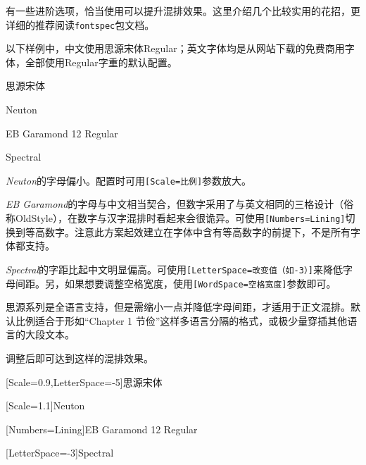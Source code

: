 \documentclass[10pt,openany]{book}
\begin{document}
\begin{sloppypar}
    有一些进阶选项，恰当使用可以提升混排效果。这里介绍几个比较实用的花招，更详细的推荐阅读\texttt{fontspec}包文档。

    以下样例中，中文使用思源宋体Regular；英文字体均是从网站下载的免费商用字体，全部使用Regular字重的默认配置。

    \begin{adjustwidth}{2em}{2em}
        \large\blankpar

        思源宋体\testtext

        Neuton\testtext

        EB Garamond 12 Regular\testtext

        Spectral\testtext

        \blankpar
    \end{adjustwidth}

    \textit{Neuton}的字母偏小。配置时可用\texttt{{[}Scale=比例{]}}参数放大。

    \textit{EB Garamond}的字母与中文相当契合，但数字采用了与英文相同的三格设计（俗称OldStyle），在数字与汉字混排时看起来会很诡异。可使用\texttt{{[}Numbers=Lining{]}}切换到等高数字。注意此方案起效建立在字体中含有等高数字的前提下，不是所有字体都支持。

    \textit{Spectral}的字距比起中文明显偏高。可使用\texttt{{[}LetterSpace=改变值（如-3）{]}}来降低字母间距。另，如果想要调整空格宽度，使用\texttt{{[}WordSpace=空格宽度{]}}参数即可。

    思源系列是全语言支持，但是需缩小一点并降低字母间距，才适用于正文混排。默认比例适合于形如“Chapter 1 节俭”这样多语言分隔的格式，或极少量穿插其他语言的大段文本。

    调整后即可达到这样的混排效果。

    \begin{adjustwidth}{2em}{2em}
        \large\blankpar

        [Scale=0.9,LetterSpace=-5]思源宋体\testtext

        [Scale=1.1]Neuton\testtext

        [Numbers=Lining]EB Garamond 12 Regular\testtext

        [LetterSpace=-3]Spectral\testtext

        \blankpar
    \end{adjustwidth}


\end{sloppypar}
\end{document}
